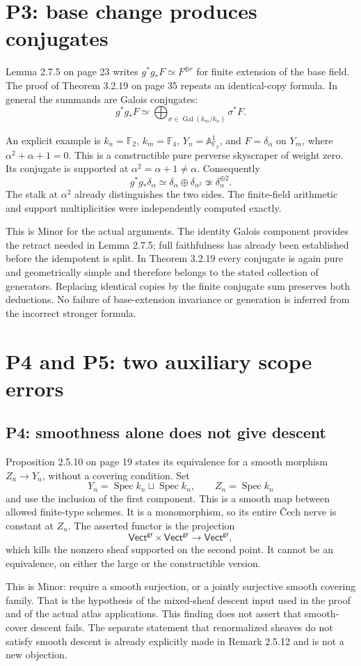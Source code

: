 \documentclass[10pt]{article}
\begin{document}
\section*{P3: base change produces conjugates}
Lemma 2.7.5 on page 23 writes \(g^*g_*F\simeq F^{\oplus r}\) for finite extension of the base field. The proof of Theorem 3.2.19 on page 35 repeats an identical-copy formula. In general the summands are Galois conjugates: \[g^*g_*F\simeq
\bigoplus_{\sigma\in\operatorname{Gal}(k_m/k_n)}\sigma^*F.\]\par
An explicit example is \(k_n=\mathbb F_2\), \(k_m=\mathbb F_4\), \(Y_n=\mathbb A^1_{\mathbb F_2}\), and \(F=\delta_\alpha\) on \(Y_m\), where \(\alpha^2+\alpha+1=0\). This is a constructible pure perverse skyscraper of weight zero. Its conjugate is supported at \(\alpha^2=\alpha+1\ne\alpha\). Consequently \[g^*g_*\delta_\alpha\simeq\delta_\alpha\oplus\delta_{\alpha^2}
\not\simeq\delta_\alpha^{\oplus2}.\] The stalk at \(\alpha^2\) already distinguishes the two sides. The finite-field arithmetic and support multiplicities were independently computed exactly.\par
This is Minor for the actual arguments. The identity Galois component provides the retract needed in Lemma 2.7.5; full faithfulness has already been established before the idempotent is split. In Theorem 3.2.19 every conjugate is again pure and geometrically simple and therefore belongs to the stated collection of generators. Replacing identical copies by the finite conjugate sum preserves both deductions. No failure of base-extension invariance or generation is inferred from the incorrect stronger formula.\par
\section*{P4 and P5: two auxiliary scope errors}
\subsection*{P4: smoothness alone does not give descent}
Proposition 2.5.10 on page 19 states its equivalence for a smooth morphism \(Z_n\to Y_n\), without a covering condition. Set \[Y_n=\operatorname{Spec}k_n\sqcup\operatorname{Spec}k_n,\qquad
Z_n=\operatorname{Spec}k_n\] and use the inclusion of the first component. This is a smooth map between allowed finite-type schemes. It is a monomorphism, so its entire Čech nerve is constant at \(Z_n\). The asserted functor is the projection \[\mathsf{Vect}^{\mathsf{gr}}\times\mathsf{Vect}^{\mathsf{gr}}\longrightarrow\mathsf{Vect}^{\mathsf{gr}},\] which kills the nonzero sheaf supported on the second point. It cannot be an equivalence, on either the large or the constructible version.\par
This is Minor: require a smooth surjection, or a jointly surjective smooth covering family. That is the hypothesis of the mixed-sheaf descent input used in the proof and of the actual atlas applications. This finding does not assert that smooth-cover descent fails. The separate statement that renormalized sheaves do not satisfy smooth descent is already explicitly made in Remark 2.5.12 and is not a new objection.\par
\end{document}
